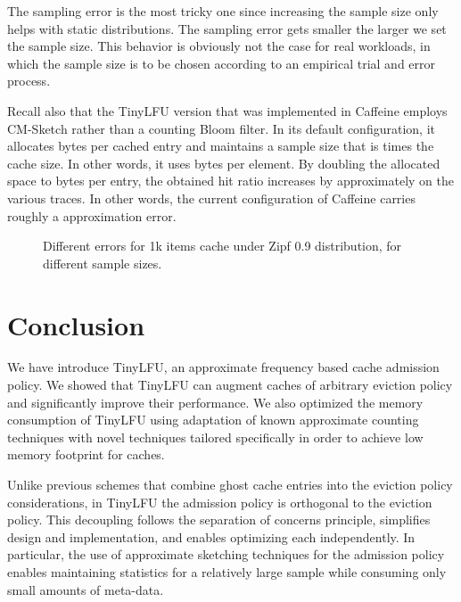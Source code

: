 \documentclass[10pt,a4paper]{article}
\begin{document}
The sampling error is the most tricky one since increasing the sample size only helps with static distributions.
The sampling error gets smaller the larger we set the sample size.
This behavior is obviously not the case for real workloads, in which the sample size is to be chosen according to an empirical trial and error process.

Recall also that the TinyLFU version that was implemented in Caffeine employs CM-Sketch rather than a counting Bloom filter.
In its default configuration, it allocates  bytes per cached entry and maintains a sample size that is  times the cache size.
In other words, it uses  bytes per element.
By doubling the allocated space to  bytes per entry, the obtained hit ratio increases by approximately  on the various traces.
In other words, the current configuration of Caffeine carries roughly a  approximation error.





\begin{figure}[t]
\caption{Different errors for 1k items cache under Zipf 0.9 distribution, for different sample sizes. }
\label{fig:summery}
\end{figure}












\section{Conclusion}
\label{sec:discussion}
We have introduce TinyLFU, an approximate frequency based cache admission policy.
We showed that TinyLFU can augment caches of arbitrary eviction policy and significantly improve their performance.
We also optimized the memory consumption of TinyLFU using adaptation of known approximate counting techniques with novel techniques tailored specifically
in order to achieve low memory footprint for caches.

Unlike previous schemes that combine ghost cache entries into the eviction policy considerations, in TinyLFU the admission policy is orthogonal to the eviction policy.
This decoupling follows the separation of concerns principle, simplifies design and implementation, and enables optimizing each independently.
In particular, the use of approximate sketching techniques for the admission policy enables maintaining statistics for a relatively large sample while consuming only small amounts of meta-data.
\end{document}
